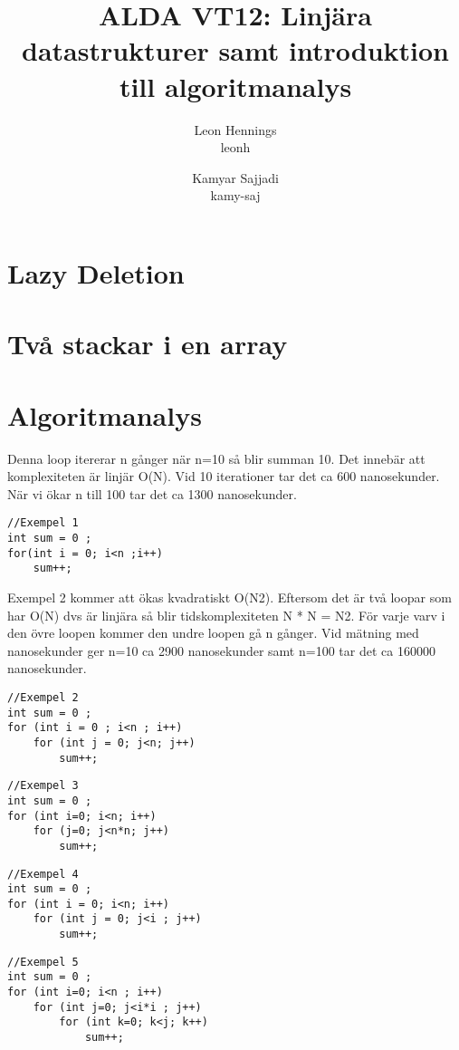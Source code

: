 \documentclass[a4paper,10pt,oneside,onecolumn]{article}
\title{ALDA VT12: Linjära datastrukturer samt introduktion till algoritmanalys}
\author{Leon Hennings\\leonh \and Kamyar Sajjadi\\kamy-saj}
\begin{document}
\maketitle

\section{Lazy Deletion}


\section{Två stackar i en array}


\section{Algoritmanalys}

Denna loop itererar n gånger när n=10 så blir summan 10. Det innebär att komplexiteten är linjär O(N).
Vid 10 iterationer tar det ca 600 nanosekunder. När vi ökar n till 100 tar det ca 1300 nanosekunder. 
\begin{lstlisting}
//Exempel 1
int sum = 0 ;
for(int i = 0; i<n ;i++)
	sum++;
\end{lstlisting}

Exempel 2 kommer att ökas kvadratiskt O(N2). Eftersom det är två loopar som har O(N) dvs är linjära så blir tidskomplexiteten N * N = N2.
För varje varv i den övre loopen kommer den undre loopen gå n gånger. Vid mätning med nanosekunder ger n=10 ca 2900 nanosekunder samt n=100 tar det ca 160000 nanosekunder. 

\begin{lstlisting}
//Exempel 2
int sum = 0 ;
for (int i = 0 ; i<n ; i++)
	for (int j = 0; j<n; j++)
		sum++;
\end{lstlisting}

\begin{lstlisting}
//Exempel 3
int sum = 0 ;
for (int i=0; i<n; i++)
	for (j=0; j<n*n; j++)
		sum++;
\end{lstlisting}

\begin{lstlisting}
//Exempel 4
int sum = 0 ;
for (int i = 0; i<n; i++)
	for (int j = 0; j<i ; j++)
		sum++;
\end{lstlisting}

\begin{lstlisting}
//Exempel 5
int sum = 0 ;
for (int i=0; i<n ; i++)
	for (int j=0; j<i*i ; j++)
		for (int k=0; k<j; k++)
			sum++;
\end{lstlisting}
\end{document}

